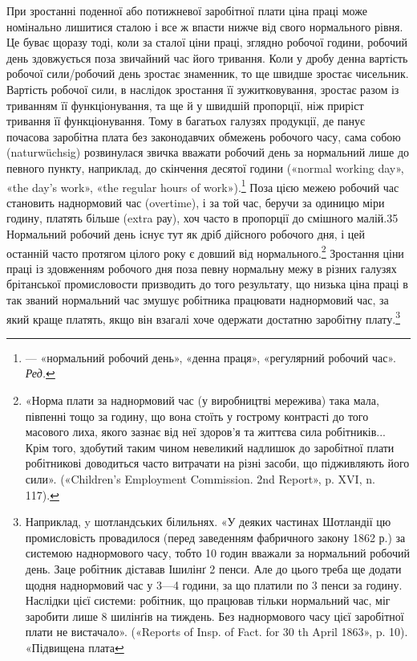 При зростанні поденної або потижневої заробітної плати ціна
праці може номінально лишитися сталою і все ж впасти нижче
від свого нормального рівня. Це буває щоразу тоді, коли за сталої
ціни праці, зглядно робочої години, робочий день здовжується
поза звичайний час його тривання. Коли у дробу
денна вартість робочої сили/робочий день зростає
знаменник, то ще швидше зростає чисельник. Вартість робочої сили, в наслідок зростання її
зужитковування, зростає разом із триванням
її функціонування, та ще й у швидшій пропорції, ніж приріст тривання її
функціонування. Тому в багатьох галузях продукції, де панує
почасова заробітна плата без законодавчих обмежень робочого
часу, сама собою (naturwüchsig) розвинулася звичка вважати
робочий день за нормальний лише до певного пункту, наприклад,
до скінчення десятої години («normal working day», «the day’s
work», «the regular hours of work»).\footnote*{
— «нормальний робочий день», «денна праця», «регулярний робочий
час». \emph{Ред.}
} Поза цією межею робочий
час становить наднормовий час (overtime), і за той час, беручи
за одиницю міри годину, платять більше (extra рау), хоч часто
в пропорції до смішного малій.35 Нормальний робочий день
існує тут як дріб дійсного робочого дня, і цей останній часто протягом
цілого року є довший від нормального.\footnote{
«Норма плати за наднормовий час (у виробництві мережива) така
мала, півпенні тощо за годину, що вона стоїть у гострому контрасті до
того масового лиха, якого зазнає від неї здоров’я та життєва сила робітників...
Крім того, здобутий таким чином невеликий надлишок до заробітної
плати робітникові доводиться часто витрачати на різні засоби,
що підживляють його сили». («Children’s Employment Commission. 2nd
Report», p. XVI, n. 117).
} Зростання ціни
праці із здовженням робочого дня поза певну нормальну межу
в різних галузях брітанської промисловости призводить до того
результату, що низька ціна праці в так званий нормальний час змушує
робітника працювати наднормовий час, за який краще платять,
якщо він взагалі хоче одержати достатню заробітну плату.\footnote{
Наприклад, y шотландських білильнях. «У деяких частинах
Шотландії цю промисловість провадилося (перед заведенням фабричного
закону 1862 р.) за системою наднормового часу, тобто 10 годин вважали
за нормальний робочий день. Заце робітник діставав Ішилінґ 2 пенси.
Але до цього треба ще додати щодня наднормовий час у 3—4 години,
за що платили по 3 пенси за годину. Наслідки цієї системи: робітник,
що працював тільки нормальний час, міг заробити лише 8 шилінґів на
тиждень. Без наднормового часу цієї заробітної плати не вистачало».
(«Reports of Insp. of Fact. for 30 th April 1863», p. 10). «Підвищена плата
}

